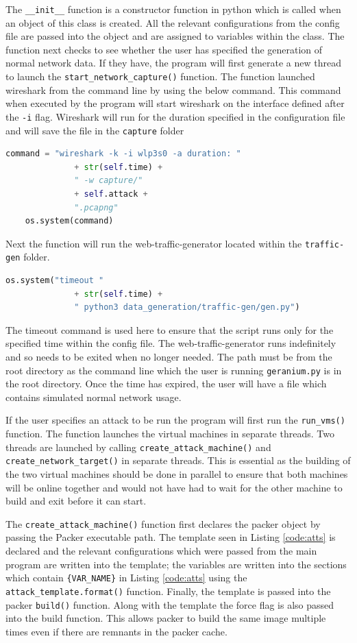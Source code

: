 The \texttt{\_\_init\_\_} function is a constructor function in python which is called when an object of this class is created. All the relevant configurations from the config file are passed into the object and are assigned to variables within the class. The function next checks to see whether the user has specified the generation of normal network data. If they have, the program will first generate a new thread to launch the \texttt{start\_network\_capture()} function. The function launched wireshark from the command line by using the below command. This command when executed by the program will start wireshark on the interface defined after the \texttt{-i} flag. Wireshark will run for the duration specified in the configuration file and will save the file in the \texttt{capture} folder 
\begin{lstlisting}[language = python]
    command = "wireshark -k -i wlp3s0 -a duration: " 
              + str(self.time) +
              " -w capture/" 
              + self.attack + 
              ".pcapng"
    os.system(command)
\end{lstlisting}
Next the function will run the web-traffic-generator \cite{wtg} located within the \texttt{traffic-gen} folder. 
\begin{lstlisting}[language = python]
    os.system("timeout " 
              + str(self.time) + 
              " python3 data_generation/traffic-gen/gen.py")
\end{lstlisting}

The timeout command is used here to ensure that the script runs only for the specified time within the config file. The web-traffic-generator runs indefinitely and so needs to be exited when no longer needed. The path must be from the root directory as the command line which the user is running \texttt{geranium.py} is in the root directory. Once the time has expired, the user will have a file which contains simulated normal network usage.

If the user specifies an attack to be run the program will first run the \texttt{run\_vms()} function. The function launches the virtual machines in separate threads. Two threads are launched by calling \texttt{create\_attack\_machine()} and \texttt{create\_network\_target()} in separate threads. This is essential as the building of the two virtual machines should be done in parallel to ensure that both machines will be online together and would not have had to wait for the other machine to build and exit before it can start. 

The \texttt{create\_attack\_machine()} function first declares the packer object by passing the Packer executable path. The template seen in Listing \ref{code:atts} is declared and the relevant configurations which were passed from the main program are written into the template; the variables are written into the sections which contain \texttt{\{VAR\_NAME\}} in Listing \ref{code:atts} using the \texttt{attack\_template.format()} function. Finally, the template is passed into the packer \texttt{build()} function. Along with the template the force flag is also passed into the build function. This allows packer to build the same image multiple times even if there are remnants in the packer cache.  

